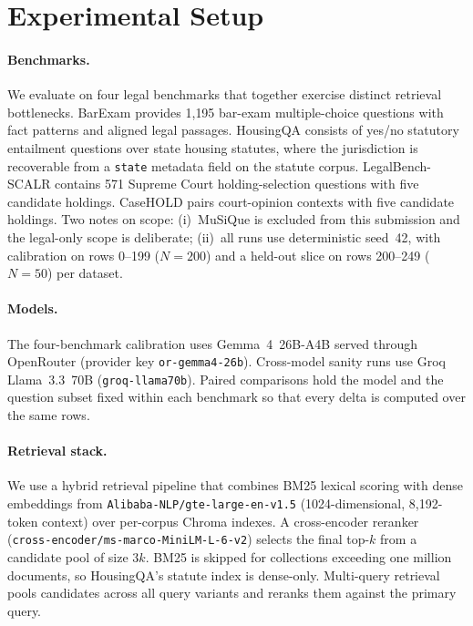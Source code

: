 \section{Experimental Setup}\label{sec:experiment}

\paragraph{Benchmarks.} We evaluate on four legal benchmarks that together
exercise distinct retrieval bottlenecks. BarExam \citep{zheng2025legalretrieval}
provides 1{,}195 bar-exam multiple-choice questions with fact patterns and
aligned legal passages. HousingQA \citep{zheng2025legalretrieval} consists of
yes/no statutory entailment questions over state housing statutes, where the
jurisdiction is recoverable from a \texttt{state} metadata field on the statute
corpus. LegalBench-SCALR \citep{guha2023legalbench} contains 571 Supreme Court
holding-selection questions with five candidate holdings. CaseHOLD
\citep{zheng2021casehold} pairs court-opinion contexts with five candidate
holdings. Two notes on scope: (i)~MuSiQue is excluded from this submission and
the legal-only scope is deliberate; (ii)~all runs use deterministic seed~42,
with calibration on rows 0--199 ($N=200$) and a held-out slice on rows 200--249
($N=50$) per dataset.

\paragraph{Models.} The four-benchmark calibration uses Gemma~4~26B-A4B served
through OpenRouter (provider key \texttt{or-gemma4-26b}). Cross-model sanity
runs use Groq Llama~3.3~70B (\texttt{groq-llama70b}). Paired comparisons hold
the model and the question subset fixed within each benchmark so that every
delta is computed over the same rows.

\paragraph{Retrieval stack.} We use a hybrid retrieval pipeline that combines
BM25 lexical scoring with dense embeddings from
\texttt{Alibaba-NLP/gte-large-en-v1.5} (1024-dimensional, 8{,}192-token
context) over per-corpus Chroma indexes. A cross-encoder reranker
(\texttt{cross-encoder/ms-marco-MiniLM-L-6-v2}) selects the final top-$k$ from
a candidate pool of size $3k$. BM25 is skipped for collections exceeding one
million documents, so HousingQA's statute index is dense-only. Multi-query
retrieval pools candidates across all query variants and reranks them against
the primary query.

